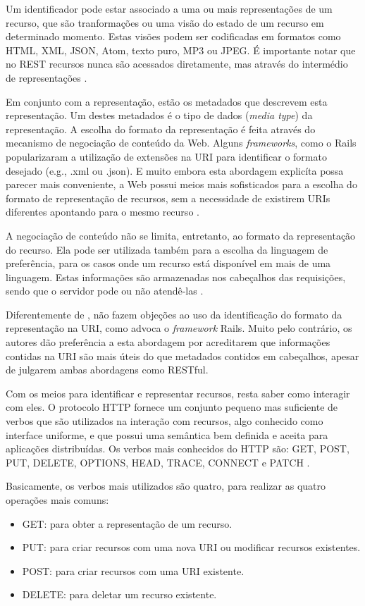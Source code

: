 \documentclass[diss]{template/setrem}
\begin{document}
Um identificador pode estar associado a uma ou mais representações de um recurso, que são tranformações ou uma visão do estado de um recurso em determinado momento. Estas visões podem ser codificadas em formatos como HTML, XML, JSON, Atom, texto puro, MP3 ou JPEG. É importante notar que no REST recursos nunca são acessados diretamente, mas através do intermédio de representações \citep{Webber2010}.

Em conjunto com a representação, estão os metadados que descrevem esta representação. Um destes metadados é o tipo de dados (\emph{media type}) da representação. A escolha do formato da representação é feita através do mecanismo de negociação de conteúdo da Web. Alguns \emph{frameworks}, como o Rails popularizaram a utilização de extensões na URI para identificar o formato desejado (e.g., .xml ou .json). E muito embora esta abordagem explicíta possa parecer mais conveniente, a Web possui meios mais sofisticados para a escolha do formato de representação de recursos, sem a necessidade de existirem URIs diferentes apontando para o mesmo recurso \citep{Fielding2000, Webber2010}.

A negociação de conteúdo não se limita, entretanto, ao formato da representação do recurso. Ela pode ser utilizada também para a escolha da linguagem de preferência, para os casos onde um recurso está disponível em mais de uma linguagem. Estas informações são armazenadas nos cabeçalhos das requisições, sendo que o servidor pode ou não atendê-las \citep{Richardson2007}.

Diferentemente de \citet{Webber2010}, \citet{Richardson2007} não fazem objeções ao uso da identificação do formato da representação na URI, como advoca o \emph{framework} Rails. Muito pelo contrário, os autores dão preferência a esta abordagem por acreditarem que informações contidas na URI são mais úteis do que metadados contidos em cabeçalhos, apesar de julgarem ambas abordagens como RESTful.

Com os meios para identificar e representar recursos, resta saber como interagir com eles. O protocolo HTTP fornece um conjunto pequeno mas suficiente de verbos que são utilizados na interação com recursos, algo conhecido como interface uniforme, e que possui uma semântica bem definida e aceita para aplicações distribuídas. Os verbos mais conhecidos do HTTP são: GET, POST, PUT, DELETE, OPTIONS, HEAD, TRACE, CONNECT e PATCH \citep{Webber2010}.

Basicamente, os verbos mais utilizados são quatro, para realizar as quatro operações mais comuns:
\begin{itemize}
	\item GET: para obter a representação de um recurso.
	\item PUT: para criar recursos com uma nova URI ou modificar recursos existentes.
	\item POST: para criar recursos com uma URI existente.
	\item DELETE: para deletar um recurso existente.
\end{itemize}
\end{document}
